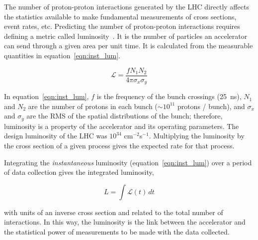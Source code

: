 The number of proton-proton interactions generated by the LHC directly affects the statistics available to make fundamental measurements of cross sections, event rates, etc. 
Predicting the number of proton-proton interactions requires defining a metric called luminosity~\cite{zyla_review_2020}. It is the number of particles an accelerator can send through a given area per unit time. It is calculated from the measurable quantities in equation~\ref{eqn:inst_lum}.

\begin{equation}
\mathcal{L} = \frac{f N_{1} N_{2} }{4 \pi \sigma_{x} \sigma_{y}}
\label{eqn:inst_lum}
\end{equation}

In equation~\ref{eqn:inst_lum}, $f$ is the frequency of the bunch crossings (\SI{25}{\nano\second}), $N_{1}$ and $N_{2}$ are the number of protons in each bunch ($\sim 10^{11}$ protons / bunch), and $\sigma_{x}$ and $\sigma_{y}$ are the RMS of the spatial distributions of the bunch; therefore, luminosity is a property of the accelerator and its operating parameters. The design luminosity of the LHC was $10^{34}$ cm$^{-2}$s$^{-1}$. Multiplying the luminosity by the cross section of a given process gives the expected rate for that process.

Integrating the \textit{instantaneous} luminosity (equation~\ref{eqn:inst_lum}) over a period of data collection gives the integrated luminosity,

\begin{equation}
L = \int \mathcal{L} \left( t \right) \,dt
\label{eqn:int_lum}
\end{equation}

with units of an inverse cross section and related to the total number of interactions. In this way, the luminosity is the link between the accelerator and the statistical power of measurements to be made with the data collected. 

